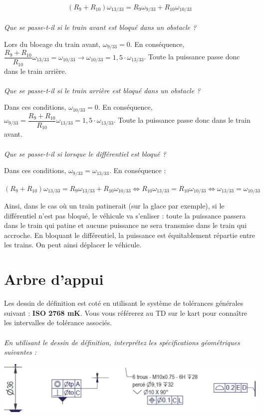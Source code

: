 \documentclass[11pt,oneside]{article}
\begin{document}
$$
\left( R_9 + R_{10}\right) \omega_{13/33} = R_9 \omega_{9/33}+R_{10}\omega_{10/33}
$$


\paragraph{}
\textit{Que se passe-t-il si le train avant est bloqué dans un obstacle ?}

Lors du blocage du train avant, $\omega_{9/33}=0$. En conséquence,  
$\dfrac{ R_9 + R_{10}}{ R_{10}} \omega_{13/33} =\omega_{10/33} \rightarrow 
\omega_{10/33} = 1,5 \cdot \omega_{13/33}$. Toute la puissance passe donc dans le train arrière.


\paragraph{}
\textit{Que se passe-t-il si le train arrière est bloqué dans un obstacle ?}

Dans ces conditions, $\omega_{10/33}=0$. En conséquence, 
$\omega_{9/33} = \dfrac{R_9 + R_{10}}{R_{10}} \omega_{13/33}  =1,5 \cdot \omega_{13/33}$.
Toute la puissance passe donc dans le train avant.

\paragraph{}
\textit{Que se passe-t-il si lorsque le différentiel est bloqué ?}

Dans ces conditions, $\omega_{9/33} =\omega_{13/33}$. En conséquence : 

$\left( R_9 + R_{10}\right) \omega_{13/33} = R_9 \omega_{13/33}+R_{10}\omega_{10/33}
\Longleftrightarrow
 R_{10} \omega_{13/33} =R_{10}\omega_{10/33}
\Longleftrightarrow
\omega_{13/33} =\omega_{10/33}
$

Ainsi, dans le cas où un train patinerait (sur la glace par exemple), si le différentiel n'est pas bloqué, le véhicule va s'enliser : toute la puissance passera dans le train qui patine et aucune puissance ne sera transmise dans le train qui accroche. En bloquant le différentiel, la puissance est équitablement répartie entre les trains. On peut ainsi déplacer le véhicule.

\newpage
\section{Arbre d'appui}
Les dessin de définition est coté en utilisant le système de tolérances générales suivant : \textbf{ISO 2768 mK}. Vous vous référerez au TD sur le kart pour connaître les intervalles de tolérance associés. 

\paragraph{}
\textit{En utilisant le dessin de définition, interprétez les spécifications géométriques suivantes :}

\begin{center}
\includegraphics[width=.8\textwidth]{png/specif}
\end{center}
\end{document}
